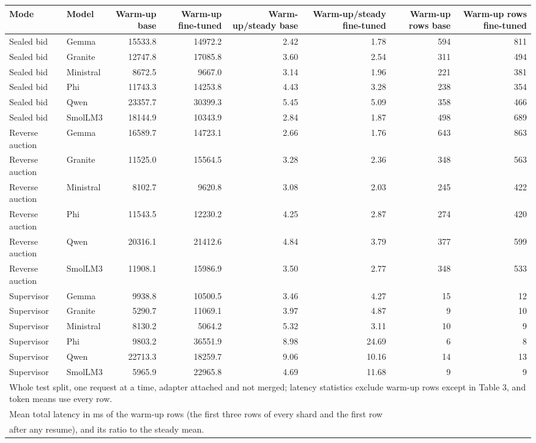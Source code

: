 \begin{tabular}{llrrrrrr}
\toprule
Mode & Model & Warm-up base & Warm-up fine-tuned & Warm-up/steady base & Warm-up/steady fine-tuned & Warm-up rows base & Warm-up rows fine-tuned \\
\midrule
Sealed bid & Gemma & 15533.8 & 14972.2 & 2.42 & 1.78 & 594 & 811 \\
Sealed bid & Granite & 12747.8 & 17085.8 & 3.60 & 2.54 & 311 & 494 \\
Sealed bid & Ministral & 8672.5 & 9667.0 & 3.14 & 1.96 & 221 & 381 \\
Sealed bid & Phi & 11743.3 & 14253.8 & 4.43 & 3.28 & 238 & 354 \\
Sealed bid & Qwen & 23357.7 & 30399.3 & 5.45 & 5.09 & 358 & 466 \\
Sealed bid & SmolLM3 & 18144.9 & 10343.9 & 2.84 & 1.87 & 498 & 689 \\
Reverse auction & Gemma & 16589.7 & 14723.1 & 2.66 & 1.76 & 643 & 863 \\
Reverse auction & Granite & 11525.0 & 15564.5 & 3.28 & 2.36 & 348 & 563 \\
Reverse auction & Ministral & 8102.7 & 9620.8 & 3.08 & 2.03 & 245 & 422 \\
Reverse auction & Phi & 11543.5 & 12230.2 & 4.25 & 2.87 & 274 & 420 \\
Reverse auction & Qwen & 20316.1 & 21412.6 & 4.84 & 3.79 & 377 & 599 \\
Reverse auction & SmolLM3 & 11908.1 & 15986.9 & 3.50 & 2.77 & 348 & 533 \\
Supervisor & Gemma & 9938.8 & 10500.5 & 3.46 & 4.27 & 15 & 12 \\
Supervisor & Granite & 5290.7 & 11069.1 & 3.97 & 4.87 & 9 & 10 \\
Supervisor & Ministral & 8130.2 & 5064.2 & 5.32 & 3.11 & 10 & 9 \\
Supervisor & Phi & 9803.2 & 36551.9 & 8.98 & 24.69 & 6 & 8 \\
Supervisor & Qwen & 22713.3 & 18259.7 & 9.06 & 10.16 & 14 & 13 \\
Supervisor & SmolLM3 & 5965.9 & 22965.8 & 4.69 & 11.68 & 9 & 9 \\
\bottomrule
\multicolumn{8}{l}{\footnotesize Whole test split, one request at a time, adapter attached and not merged; latency statistics exclude warm-up rows except in Table 3, and token means use every row.} \\
\multicolumn{8}{l}{\footnotesize Mean total latency in ms of the warm-up rows (the first three rows of every shard and the first row} \\
\multicolumn{8}{l}{\footnotesize after any resume), and its ratio to the steady mean.} \\
\end{tabular}
